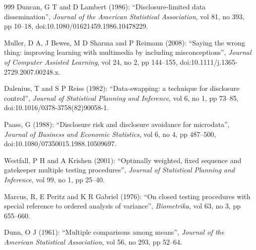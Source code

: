 \begin{thebibliography}{999}
Duncan, G T and D Lambert (1986): ``Disclosure-limited data dissemination'', \emph{Journal of the American Statistical Association}, vol 81, no 393, pp 10--18, doi:10.1080/01621459.1986.10478229.

Muller, D A, J Bewes, M D Sharma and P Reimann (2008): ``Saying the wrong thing: improving learning with multimedia by including misconceptions'', \emph{Journal of Computer Assisted Learning}, vol 24, no 2, pp 144--155, doi:10.1111/j.1365-2729.2007.00248.x.

Dalenius, T and S P Reiss (1982): ``Data-swapping: a technique for disclosure control'', \emph{Journal of Statistical Planning and Inference}, vol 6, no 1, pp 73--85, doi:10.1016/0378-3758(82)90058-1.

Paass, G (1988): ``Disclosure risk and disclosure avoidance for microdata'', \emph{Journal of Business and Economic Statistics}, vol 6, no 4, pp 487--500, doi:10.1080/07350015.1988.10509697.

Westfall, P H and A Krishen (2001): ``Optimally weighted, fixed sequence and gatekeeper multiple testing procedures'', \emph{Journal of Statistical Planning and Inference}, vol 99, no 1, pp 25--40.

Marcus, R, E Peritz and K R Gabriel (1976): ``On closed testing procedures with special reference to ordered analysis of variance'', \emph{Biometrika}, vol 63, no 3, pp 655--660.

Dunn, O J (1961): ``Multiple comparisons among means'', \emph{Journal of the American Statistical Association}, vol 56, no 293, pp 52--64.

\end{thebibliography}
